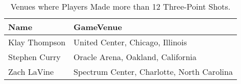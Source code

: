 \documentclass[11pt,a4paper]{article}
\begin{document}
\begin{table}[ht]
\centering
\begin{tabular}{ll}
  \hline
Name & GameVenue \\ 
  \hline
Klay Thompson & United Center, Chicago, Illinois \\ 
  Stephen Curry & Oracle Arena, Oakland, California \\ 
  Zach LaVine & Spectrum Center, Charlotte, North Carolina \\ 
   \hline
\end{tabular}
\caption{Venues where Players Made more than 12 Three-Point Shots.} 
\label{tab:nbaTable}
\end{table}
\end{document}
